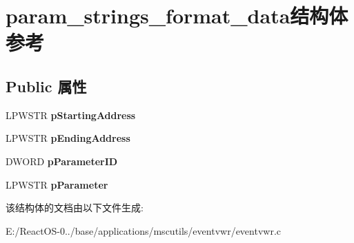 \hypertarget{structparam__strings__format__data}{}\section{param\+\_\+strings\+\_\+format\+\_\+data结构体 参考}
\label{structparam__strings__format__data}
\subsection*{Public 属性}
\begin{DoxyCompactItemize}
\item 
\mbox{\label{structparam__strings__format__data_ab0ee257ed0c7f9d86e5abacda33dc5c2}} 
L\+P\+W\+S\+TR {\bfseries p\+Starting\+Address}
\item 
\mbox{\label{structparam__strings__format__data_aefb788b7959489ee5ec18ab7de7d17d3}} 
L\+P\+W\+S\+TR {\bfseries p\+Ending\+Address}
\item 
\mbox{\label{structparam__strings__format__data_a075d5f56b78f5a1014200a065b688cae}} 
D\+W\+O\+RD {\bfseries p\+Parameter\+ID}
\item 
\mbox{\label{structparam__strings__format__data_a83bd041d734af9edfca162551dbfe475}} 
L\+P\+W\+S\+TR {\bfseries p\+Parameter}
\end{DoxyCompactItemize}


该结构体的文档由以下文件生成\+:\begin{DoxyCompactItemize}
\item 
E\+:/\+React\+O\+S-\/0../base/applications/mscutils/eventvwr/eventvwr.\+c\end{DoxyCompactItemize}
